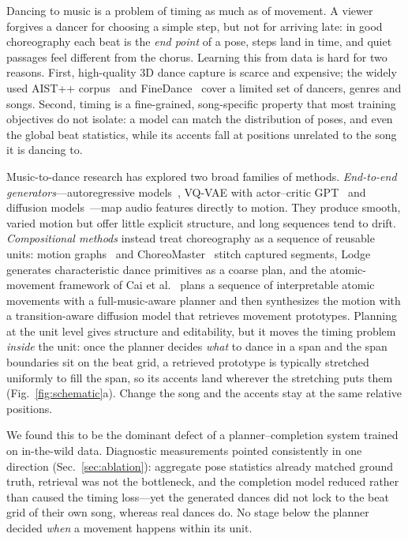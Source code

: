 \documentclass[10pt]{article}
\begin{document}
Dancing to music is a problem of timing as much as of movement.
A viewer forgives a dancer for choosing a simple step, but not for arriving late: in good choreography each beat is the \emph{end point} of a pose, steps land in time, and quiet passages feel different from the chorus.
Learning this from data is hard for two reasons.
First, high-quality 3D dance capture is scarce and expensive; the widely used AIST++ corpus~\cite{li2021aist} and FineDance~\cite{li2023finedance} cover a limited set of dancers, genres and songs.
Second, timing is a fine-grained, song-specific property that most training objectives do not isolate: a model can match the distribution of poses, and even the global beat statistics, while its accents fall at positions unrelated to the song it is dancing to.

Music-to-dance research has explored two broad families of methods.
\emph{End-to-end generators}---autoregressive models~\cite{lee2019dancing,huang2021dancerevolution,li2021aist}, VQ-VAE with actor--critic GPT~\cite{siyao2022bailando} and diffusion models~\cite{tseng2023edge,li2024lodge}---map audio features directly to motion.
They produce smooth, varied motion but offer little explicit structure, and long sequences tend to drift.
\emph{Compositional methods} instead treat choreography as a sequence of reusable units: motion graphs~\cite{kovar2002motiongraphs} and ChoreoMaster~\cite{chen2021choreomaster} stitch captured segments, Lodge~\cite{li2024lodge} generates characteristic dance primitives as a coarse plan, and the atomic-movement framework of Cai et al.~\cite{cai2026atomic} plans a sequence of interpretable atomic movements with a full-music-aware planner and then synthesizes the motion with a transition-aware diffusion model that retrieves movement prototypes.
Planning at the unit level gives structure and editability, but it moves the timing problem \emph{inside} the unit: once the planner decides \emph{what} to dance in a span and the span boundaries sit on the beat grid, a retrieved prototype is typically stretched uniformly to fill the span, so its accents land wherever the stretching puts them (Fig.~\ref{fig:schematic}a).
Change the song and the accents stay at the same relative positions.

We found this to be the dominant defect of a planner--completion system trained on in-the-wild data.
Diagnostic measurements pointed consistently in one direction (Sec.~\ref{sec:ablation}): aggregate pose statistics already matched ground truth, retrieval was not the bottleneck, and the completion model reduced rather than caused the timing loss---yet the generated dances did not lock to the beat grid of their own song, whereas real dances do.
No stage below the planner decided \emph{when} a movement happens within its unit.
\end{document}
